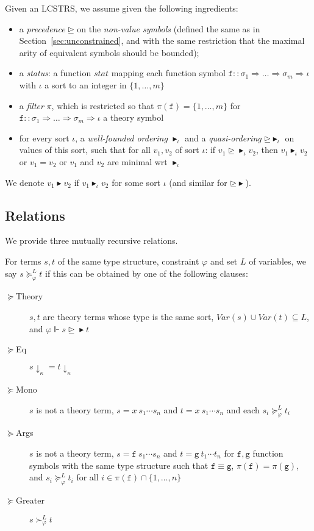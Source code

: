 \documentclass[a4paper,USenglish,cleveref,autoref,thm-restate]{lipics-v2021}
\newcommand{\Var}{\mathit{Var}}
\newcommand{\gtvA}{L}
\newcommand{\downarrowcalc}{\downarrow_\kappa}
\newcommand{\arrtype}{\Rightarrow}
\newcommand{\geqth}{\succeq_\varphi^\gtvA}
\newcommand{\grth}{\succ_\varphi^\gtvA}
\newcommand{\geqpred}{\unrhd}
\newcommand{\eqpred}{\equiv}
\newcommand{\grsort}{\blacktriangleright}
\newcommand{\geqsort}{\unrhd\!\!\!\!\!\!\blacktriangleright}
\newcommand{\symb}[1]{\mathtt{#1}}
\newcommand{\afun}{\symb{f}}
\newcommand{\bfun}{\symb{g}}
\newcommand{\atype}{\sigma}
\newcommand{\asort}{\iota}
\newcommand{\avar}{x}
\newcommand{\status}{\mathit{stat}}
\newcommand{\filter}{\pi}
\begin{document}
Given an LCSTRS, we assume given the following ingredients:
\begin{itemize}
\item a \emph{precedence} $\geqpred$ on the \emph{non-value symbols} (defined the same as in
  Section~\ref{sec:unconstrained}, and with the same restriction that the maximal arity of
  equivalent symbols should be bounded);
\item a \emph{status}: a function $\status$ mapping each function symbol $\afun ::
  \atype_1 \arrtype \dots \arrtype \atype_m \arrtype \asort$ with $\asort$ a sort to an integer
  in $\{1,\dots,m\}$
\item a \emph{filter} $\filter$, which is restricted so that $\filter(\afun) = \{1,\dots,m\}$ for
  $\afun :: \atype_1 \arrtype \dots \arrtype \atype_m \arrtype \asort$ a theory symbol
\item for every sort $\asort$, a \emph{well-founded ordering} $\grsort_{\asort}$ and a
  \emph{quasi-ordering} $\geqsort_{\asort}$ on values of this sort, such that for all $v_1,v_2$ of
  sort $\asort$: if $v_1 \geqsort_\asort v_2$, then $v_1 \grsort_\asort v_2$ or $v_1 = v_2$ or
  $v_1$ and $v_2$ are minimal wrt $\grsort_{\asort}$
\end{itemize}
We denote $v_1 \grsort v_2$ if $v_1 \grsort_\asort v_2$ for some sort $\asort$ (and similar for
$\geqsort$).

\subsection{Relations}

We provide three mutually recursive relations.

For terms $s,t$ of the same type structure, constraint $\varphi$ and set $\gtvA$ of variables, we
say $s \geqth t$ if this can be obtained by one of the following clauses:
\begin{description}
\item[$\succeq$Theory] $s,t$ are theory terms whose type is the same sort,
  $\Var(s) \cup \Var(t) \subseteq \gtvA$,
  and $\varphi \Vdash s \geqsort t$
\item[$\succeq$Eq] $s\downarrowcalc = t\downarrowcalc$
\item[$\succeq$Mono] $s$ is not a theory term,
  $s = \avar\ s_1 \cdots s_n$ and $t = \avar\ s_1 \cdots s_n$ and each $s_i \geqth t_i$
\item[$\succeq$Args] $s$ is not a theory term,
  $s = \afun\ s_1 \cdots s_n$ and $t = \bfun\ t_1 \cdots t_n$ for $\afun,\bfun$
  function symbols with the same type structure such that $\afun \eqpred \bfun$,
  $\filter(\afun) = \filter(\bfun)$, and $s_i \geqth t_i$ for all $i \in \filter(\afun) \cap
  \{1,\dots,n\}$
\item[$\succeq$Greater] $s \grth t$
\end{description}
\end{document}
